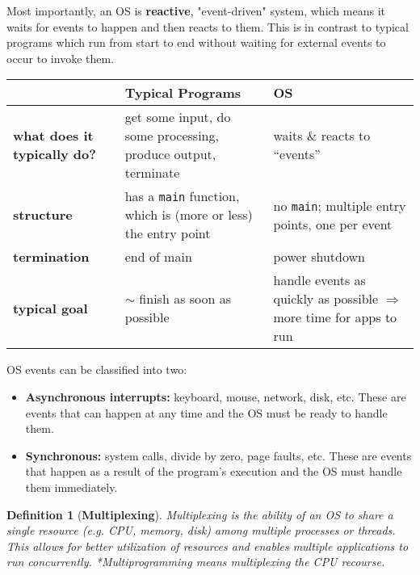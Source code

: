 \documentclass[openany,12pt]{book}
\newtheorem*{definition}{Definition}
\begin{document}
\vspace{1em}
Most importantly, an OS is \textbf{reactive}, "event-driven" system, which means it waits for events to happen and then reacts to them. This is in contrast to typical programs which run from start to end without waiting for external events to occur to invoke them.

\begin{tabular}{|>{\raggedright\arraybackslash}p{3.5cm} | >{\raggedright\arraybackslash}p{6.5cm} | >{\raggedright\arraybackslash}p{5.5cm}|}
    \hline
    \textbf{}                           & \textbf{Typical Programs}                                             & \textbf{OS}                                                                  \\
    \hline
    \textbf{what does it typically do?} & get some input, do some processing, produce output, terminate         & waits \& reacts to ``events''                                                \\
    \hline
    \textbf{structure}                  & has a \texttt{main} function, which is (more or less) the entry point & no \texttt{main}; multiple entry points, one per event                       \\
    \hline
    \textbf{termination}                & end of main                                                           & power shutdown                                                               \\
    \hline
    \textbf{typical goal}               & $\sim$ finish as soon as possible                                     & handle events as quickly as possible $\Rightarrow$ more time for apps to run \\
    \hline
\end{tabular}
\newline
OS events can be classified into two:
\begin{itemize}
    \item \textbf{Asynchronous interrupts:} keyboard, mouse, network, disk, etc. These are events that can happen at any time and the OS must be ready to handle them.
    \item \textbf{Synchronous:} system calls, divide by zero, page faults, etc. These are events that happen as a result of the program's execution and the OS must handle them immediately.
\end{itemize}


\begin{definition}
    [\textbf{Multiplexing}]
    Multiplexing is the ability of an OS to share a single resource (e.g. CPU, memory, disk) among multiple processes or threads. This allows for better utilization of resources and enables multiple applications to run concurrently.
    *Multiprogramming  means multiplexing the CPU recourse.
\end{definition}
\end{document}
